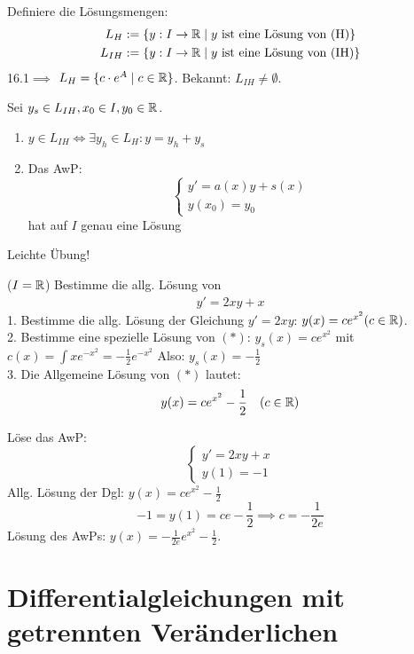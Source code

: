 \documentclass[a4paper,twoside,DIV15,BCOR12mm,chapterprefix=true,headings=twolinechapter]{scrbook}
\begin{document}
\begin{definition}
Definiere die Lösungsmengen:
\begin{align*}
L_H&:=\{y:I\to\mathbb{R}\mid y\text{ ist eine Lösung von (H)}\}\\
L_{IH}&:=\{y:I\to\mathbb{R}\mid y\text{ ist eine Lösung von (IH)}\}
\end{align*}
16.1$\implies$ $L_H=\{c\cdot e^{A}\mid c\in \mathbb{R}\}$. Bekannt: $L_{IH}\ne\emptyset$.
\end{definition}

\begin{satz}[Lösungen]
Sei $y_s\in L_{IH}, x_0\in I,y_0\in \mathbb{R}$.
\begin{enumerate}
\item $y\in L_{IH}\iff \exists y_h\in L_{H}: y=y_h+y_s$
\item Das AwP:
\[\begin{cases}
y'=a(x)y+s(x)\\
y(x_0)=y_0
\end{cases}\]
hat auf $I$ genau eine Lösung
\end{enumerate}
\end{satz}

\begin{beweis}
Leichte Übung!
\end{beweis}

\begin{beispiele}
\item ($I=\mathbb{R}$) Bestimme die allg. Lösung von
\begin{align*}
y'=2xy+x\tag{$*$}
\end{align*}
1. Bestimme die allg. Lösung der Gleichung $y'=2xy$: $y(x)=ce^{x^2} (c\in\mathbb{R})$.\\
2. Bestimme eine spezielle Lösung von $(*)$: $y_s(x)=ce^{x^2}$ mit $c(x)=\int xe^{-x^2}=-\frac 12 e^{-x^2}$
Also: $y_s(x)=-\frac12$\\
3. Die Allgemeine Lösung von $(*)$ lautet: 
\[y(x)=ce^{x^2}-\frac 12 \quad(c\in\mathbb{R})\]
\item Löse das AwP:
\[\begin{cases}
y'=2xy+x\\
y(1)=-1
\end{cases}\]
Allg. Lösung der Dgl: $y(x)=ce^{x^2}-\frac 12$\\
\[-1=y(1)=ce-\frac 12\implies c=-\frac 1{2e}\]
Lösung des AwPs: $y(x)=-\frac1{2e}e^{x^2}-\frac 12$.
\end{beispiele}

\chapter{Differentialgleichungen mit getrennten Veränderlichen}
\end{document}
